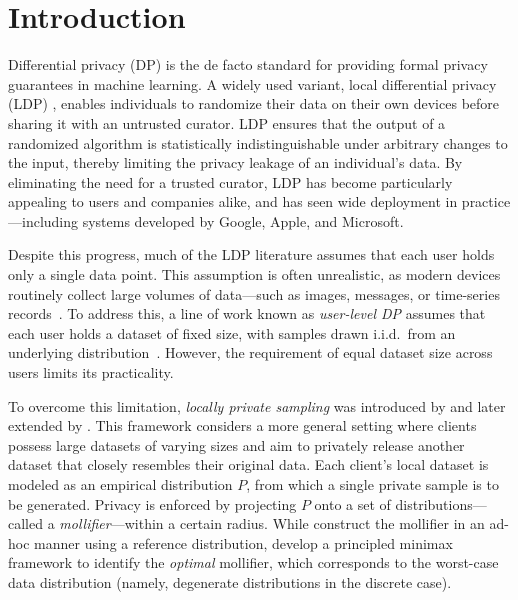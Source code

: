 \documentclass[accepted]{article}
\theoremstyle{plain} %
\theoremstyle{definition}
\theoremstyle{remark}
\begin{document}
\section{Introduction}\label{sec: introduction}
\vspace{0.1cm}
Differential privacy (DP) \citep{dwork2006calibrating} is the de facto standard for providing formal privacy guarantees in machine learning. A widely used variant, local differential privacy (LDP) \citep{kasiviswanathan2011can}, enables individuals to randomize their data on their own devices before sharing it with an untrusted curator. LDP ensures that the output of a randomized algorithm is statistically indistinguishable under arbitrary changes to the input, thereby limiting the privacy leakage of an individual’s data. By eliminating the need for a trusted curator, LDP has become particularly appealing to users and companies alike, and has seen wide deployment in practice—including systems developed by Google, Apple, and Microsoft\citep{erlingsson2014rappor, bittau2017prochlo, Apple_Privacy, ding2017collecting}.

Despite this progress, much of the LDP literature assumes that each user holds only a single data point. This assumption is often unrealistic, as modern devices routinely collect large volumes of data—such as images, messages, or time-series records~\citep{husain2020local}. To address this, a line of work known as \emph{user-level DP} assumes that each user holds a dataset of fixed size, with samples drawn i.i.d.\ from an underlying distribution~\citep{kent2024rate, mao2024privshape, bassily2023user, acharya2023discrete, huang2023federated, girgis2022distributed, levy2021learning, ghazi2021user, zhao2024huber}. However, the requirement of equal dataset size across users limits its practicality.

To overcome this limitation, \textit{locally private sampling} was introduced by \citet{husain2020local} and later extended by \citet{park2024exactly}. This framework considers a more general setting where clients possess large datasets of varying sizes and aim to privately release another dataset that closely resembles their original data. Each client's local dataset is modeled as an empirical distribution $P$, from which a single private sample is to be generated. Privacy is enforced by projecting $P$ onto a set of distributions— called a \textit{mollifier}—within a certain radius. While \citet{husain2020local} construct the mollifier in an ad-hoc manner using a reference distribution, \citet{park2024exactly} develop a principled minimax framework to identify the \textit{optimal} mollifier, which corresponds to the worst-case data distribution (namely, degenerate distributions in the discrete case).
\end{document}
